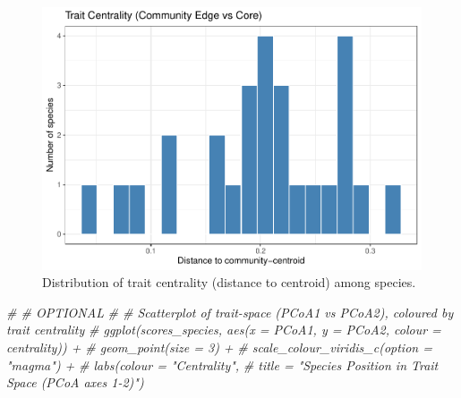 \documentclass[
]{article}
\newenvironment{Shaded}{\begin{snugshade}}{\end{snugshade}}
\newcommand{\CommentTok}[1]{\textcolor[rgb]{0.56,0.35,0.01}{\textit{#1}}}
\begin{document}
\begin{figure}
\includegraphics[width=1\linewidth]{man/figures/README-trait-centrality-1} \caption{Distribution of trait centrality (distance to centroid) among species.}\label{fig:trait-centrality}
\end{figure}

\begin{Shaded}
\begin{Highlighting}[]

\CommentTok{\# \# OPTIONAL}
\CommentTok{\# \# Scatterplot of trait{-}space (PCoA1 vs PCoA2), coloured by trait centrality}
\CommentTok{\# ggplot(scores\_species, aes(x = PCoA1, y = PCoA2, colour = centrality)) +}
\CommentTok{\#   geom\_point(size = 3) +}
\CommentTok{\#   scale\_colour\_viridis\_c(option = "magma") +}
\CommentTok{\#   labs(colour = "Centrality",}
\CommentTok{\#        title = "Species Position in Trait Space (PCoA axes 1-2)")}
\end{Highlighting}
\end{Shaded}
\end{document}
